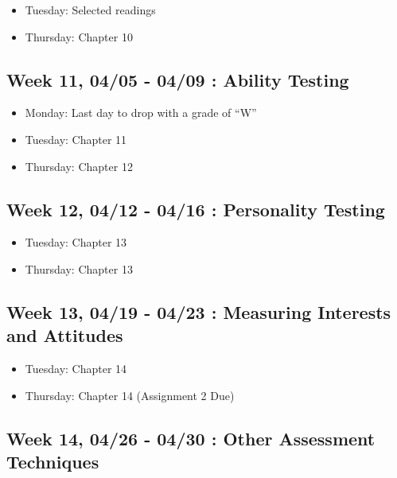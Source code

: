 \documentclass[11pt,]{article}
\providecommand{\tightlist}{%
  \setlength{\itemsep}{0pt}\setlength{\parskip}{0pt}}
\begin{document}
\begin{itemize}
\tightlist
\item
  Tuesday: Selected readings
\item
  Thursday: Chapter 10
\end{itemize}

\hypertarget{week-11-0405---0409-ability-testing}{%
\subsection{Week 11, 04/05 - 04/09 : Ability
Testing}\label{week-11-0405---0409-ability-testing}}

\begin{itemize}
\tightlist
\item
  Monday: Last day to drop with a grade of ``W''
\item
  Tuesday: Chapter 11
\item
  Thursday: Chapter 12
\end{itemize}

\hypertarget{week-12-0412---0416-personality-testing}{%
\subsection{Week 12, 04/12 - 04/16 : Personality
Testing}\label{week-12-0412---0416-personality-testing}}

\begin{itemize}
\tightlist
\item
  Tuesday: Chapter 13
\item
  Thursday: Chapter 13
\end{itemize}

\hypertarget{week-13-0419---0423-measuring-interests-and-attitudes}{%
\subsection{Week 13, 04/19 - 04/23 : Measuring Interests and
Attitudes}\label{week-13-0419---0423-measuring-interests-and-attitudes}}

\begin{itemize}
\tightlist
\item
  Tuesday: Chapter 14
\item
  Thursday: Chapter 14 (Assignment 2 Due)
\end{itemize}

\hypertarget{week-14-0426---0430-other-assessment-techniques}{%
\subsection{Week 14, 04/26 - 04/30 : Other Assessment
Techniques}\label{week-14-0426---0430-other-assessment-techniques}}
\end{document}
